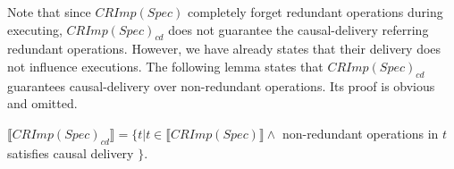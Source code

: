 {\color {red}Note that since $CRImp(Spec)$ completely forget redundant operations during executing, $CRImp(Spec)_{\textit{cd}}$ does not guarantee the causal-delivery referring redundant operations. However, we have already states that their delivery does not influence executions.} The following lemma states that $CRImp(Spec)_{\textit{cd}}$ guarantees causal-delivery over non-redundant operations. Its proof is obvious and omitted.

\begin{lemma}
\label{lemma:CRImpcdSpec guarantees causal delivery for non-redundant operations}
$\llbracket CRImp(Spec)_{cd} \rrbracket = \{ t \vert t \in \llbracket CRImp(Spec) \rrbracket \wedge $ non-redundant operations in $t$ satisfies causal delivery $\}$.
\end{lemma}

























